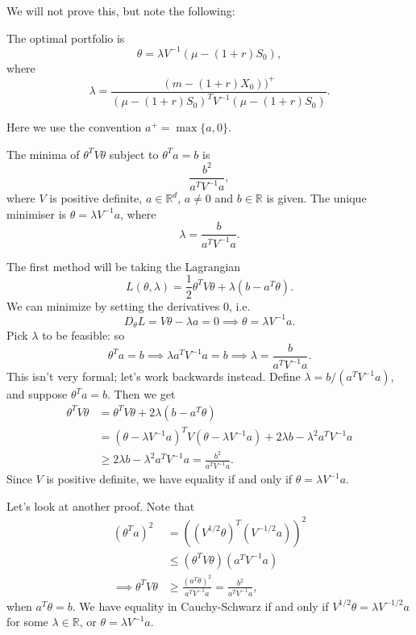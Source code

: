 \documentclass[12pt]{article}
\begin{document}
We will not prove this, but note the following:

\begin{theorem}
	The optimal portfolio is
	\[
	\theta = \lambda V^{-1}(\mu - (1+r)S_0),
	\]
	where
	\[
	\lambda = \frac{(m-(1+r)X_0))^+}{(\mu - (1+r)S_0)^T V^{-1} (\mu - (1+r)S_0)}.
	\]
\end{theorem}

Here we use the convention $a^{+} = \max\{a, 0\}$.


\begin{lemma}
	The minima of $\theta^{T}V\theta$ subject to $\theta^{T}a = b$ is
	\[
	\frac{b^2}{a^{T}V^{-1}a},
	\]
	where $V$ is positive definite, $a \in \mathbb{R}^{d}$, $a \neq 0$ and $b \in \mathbb{R}$ is given. The unique minimiser is $\theta = \lambda V^{-1} a$, where
	\[
	\lambda = \frac{b}{a^{T}V^{-1}a}.
	\]
\end{lemma}

\begin{proofbox}
	The first method will be taking the Lagrangian
	\[
	L(\theta, \lambda) = \frac{1}{2} \theta^{T} V\theta + \lambda(b - a^{T}\theta).
	\]
	We can minimize by setting the derivatives $0$, i.e.
	\[
	D_\theta L = V\theta - \lambda a = 0 \implies \theta = \lambda V^{-1} a.
	\]
	Pick $\lambda$ to be feasible: so
	\[
	\theta^{T} a = b \implies \lambda a^{T} V^{-1} a = b \implies \lambda = \frac{b}{a^{T}V^{-1}a}.
	\]
	This isn't very formal; let's work backwards instead. Define $\lambda = b/(a^{T}V^{-1}a)$, and suppose $\theta^{T}a = b$. Then we get
	\begin{align*}
		\theta^{T}V\theta &= \theta^{T}V\theta + 2\lambda(b - a^{T}\theta) \\
				  &= (\theta - \lambda V^{-1}a)^{T}V(\theta - \lambda V^{-1}a) + 2 \lambda b - \lambda^2 a^{T}V^{-1} a \\
				  &\geq 2 \lambda b - \lambda^2 a^{T} V^{-1} a = \frac{b^2}{a^{T}V^{-1}a}.
	\end{align*}
	Since $V$ is positive definite, we have equality if and only if $\theta = \lambda V^{-1}a$.

	Let's look at another proof. Note that
	\begin{align*}
		(\theta^{T}a)^2 &= ((V^{1/2}\theta)^{T}(V^{-1/2}a))^2 \\
				&\leq (\theta^{T}V\theta)(a^{T}V^{-1}a) \\
		\implies \theta^{T}V\theta &\geq \frac{(a^{T}\theta)^2}{a^{T}V^{-1}a} = \frac{b^2}{a^{T}V^{-1}a},
	\end{align*}
	when $a^{T}\theta = b$. We have equality in Cauchy-Schwarz if and only if $V^{1/2}\theta = \lambda V^{-1/2}a$ for some $\lambda \in \mathbb{R}$, or $\theta = \lambda V^{-1}a$.
\end{proofbox}
\end{document}
